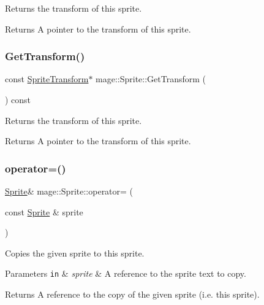 Returns the transform of this sprite.

\begin{DoxyReturn}{Returns}
A pointer to the transform of this sprite. 
\end{DoxyReturn}
\hypertarget{classmage_1_1_sprite_a8e2c0ae634492efacc92aab2e18e701c}{}\label{classmage_1_1_sprite_a8e2c0ae634492efacc92aab2e18e701c} 
\subsubsection{\texorpdfstring{Get\+Transform()}{GetTransform()}\hspace{0.1cm}{\footnotesize\ttfamily [2/2]}}
{\footnotesize\ttfamily const \hyperlink{structmage_1_1_sprite_transform}{Sprite\+Transform}$\ast$ mage\+::\+Sprite\+::\+Get\+Transform (\begin{DoxyParamCaption}{ }\end{DoxyParamCaption}) const\hspace{0.3cm}{\ttfamily [noexcept]}}

Returns the transform of this sprite.

\begin{DoxyReturn}{Returns}
A pointer to the transform of this sprite. 
\end{DoxyReturn}
\hypertarget{classmage_1_1_sprite_aa24dfc716d8b79cc16b4c27409f8cc6b}{}\label{classmage_1_1_sprite_aa24dfc716d8b79cc16b4c27409f8cc6b} 
\subsubsection{\texorpdfstring{operator=()}{operator=()}\hspace{0.1cm}{\footnotesize\ttfamily [1/2]}}
{\footnotesize\ttfamily \hyperlink{classmage_1_1_sprite}{Sprite}\& mage\+::\+Sprite\+::operator= (\begin{DoxyParamCaption}\item[{const \hyperlink{classmage_1_1_sprite}{Sprite} \&}]{sprite }\end{DoxyParamCaption})\hspace{0.3cm}{\ttfamily [delete]}}

Copies the given sprite to this sprite.


\begin{DoxyParams}[1]{Parameters}
\mbox{\tt in}  & {\em sprite} & A reference to the sprite text to copy. \\
\hline
\end{DoxyParams}
\begin{DoxyReturn}{Returns}
A reference to the copy of the given sprite (i.\+e. this sprite). 
\end{DoxyReturn}
\hypertarget{classmage_1_1_sprite_a808d87aeb6d652f9a53e967a75a1eede}{}\label{classmage_1_1_sprite_a808d87aeb6d652f9a53e967a75a1eede} 
